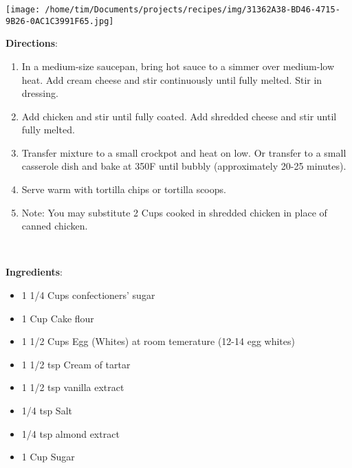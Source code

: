 \documentclass[11pt, twoside, openany]{book}
\begin{document}
\begin{minipage}[t]{0.2\linewidth}
\centering \strut\vspace*{-\baselineskip}\newline
\texttt{[image: /home/tim/Documents/projects/recipes/img/31362A38-BD46-4715-9B26-0AC1C3991F65.jpg]}\\
\end{minipage}\vspace{3mm}
\textbf{Directions}:
\vspace{-3mm}\begin{enumerate}\setlength\itemsep{-1mm}
\item In a medium-size saucepan, bring hot sauce to a simmer over medium-low heat. Add cream cheese and stir continuously until fully melted. Stir in dressing.
\item Add chicken and stir until fully coated. Add shredded cheese and stir until fully melted.
\item Transfer mixture to a small crockpot and heat on low. Or transfer to a small casserole dish and bake at 350F until bubbly (approximately 20-25 minutes). 
\item Serve warm with tortilla chips or tortilla scoops.
\item Note: You may substitute 2 Cups cooked in shredded chicken in place of canned chicken.
\end{enumerate}
 \label{angel-food-cake}\hfill\textit{}\\
\begin{minipage}[t]{0.8\linewidth}
\textbf{Ingredients}:\vspace{-3mm}
\begin{multicols}{2}
\begin{itemize}\setlength\itemsep{-1mm}
\item 1 1/4 Cups confectioners' sugar
\item 1 Cup Cake flour
\item 1 1/2 Cups Egg (Whites) at room temerature (12-14 egg whites)
\item 1 1/2 tsp Cream of tartar
\item 1 1/2 tsp vanilla extract
\item 1/4 tsp Salt
\item 1/4 tsp almond extract
\item 1 Cup Sugar
\end{itemize}
\end{multicols}
\end{minipage}
\end{document}
